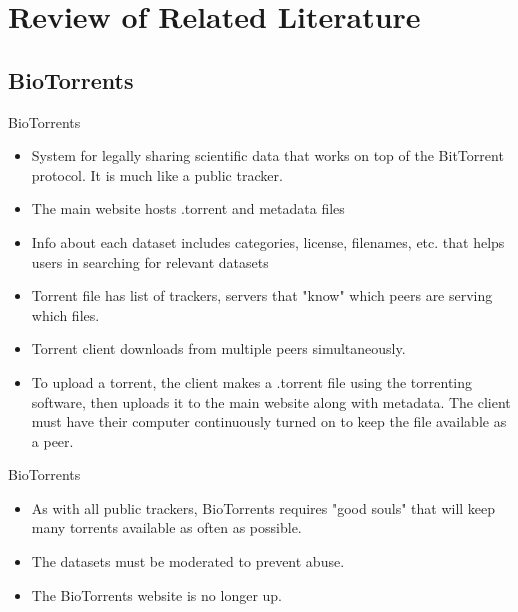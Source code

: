 \documentclass{beamer}
\begin{document}
\section{Review of Related Literature}
    \subsection{BioTorrents}
    \begin{frame}{BioTorrents}
        \begin{itemize}
        \item System for legally sharing scientific data that works on top of the BitTorrent protocol. It is much like a public tracker.
        \item The main website hosts .torrent and metadata files
        \item Info about each dataset includes categories, license, filenames, etc. that helps users in searching for relevant datasets
        \item Torrent file has list of trackers, servers that "know" which peers are serving which files.
        \item Torrent client downloads from multiple peers simultaneously.
        \item To upload a torrent, the client makes a .torrent file using the torrenting software, then uploads it to the main website along with metadata. The client must have their computer continuously turned on to keep the file available as a peer. \cite{biotorrents}
        \end{itemize}
    \end{frame}
    
    \begin{frame}{BioTorrents}
        \begin{itemize}
            \item As with all public trackers, BioTorrents requires "good souls" that will keep many torrents available as often as possible.
            \item The datasets must be moderated to prevent abuse.
            \item The BioTorrents website is no longer up.
        \end{itemize}
    \end{frame}
 
    
\end{document}
